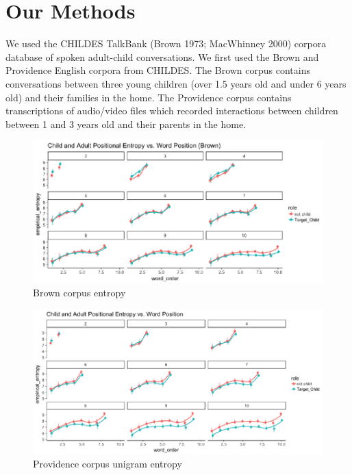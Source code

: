 \documentclass[10pt, letterpaper]{article}
\newenvironment{CodeChunk}{}{}
\begin{document}
\section{Our Methods}\label{our-methods}

We used the CHILDES TalkBank (Brown 1973; MacWhinney 2000) corpora
database of spoken adult-child conversations. We first used the Brown
and Providence English corpora from CHILDES. The Brown corpus contains
conversations between three young children (over 1.5 years old and under
6 years old) and their families in the home. The Providence corpus
contains transcriptions of audio/video files which recorded interactions
between children between 1 and 3 years old and their parents in the
home.

\begin{CodeChunk}
\begin{figure}[h]

{\centering \includegraphics{figs/brown_PE-1} 

}

\caption[Brown corpus entropy]{Brown corpus entropy}\label{fig:brown_PE}
\end{figure}
\end{CodeChunk}

\begin{CodeChunk}
\begin{figure}[h]

{\centering \includegraphics{figs/providence_PE-1} 

}

\caption[Providence corpus unigram entropy]{Providence corpus unigram entropy}\label{fig:providence_PE}
\end{figure}
\end{CodeChunk}
\end{document}
